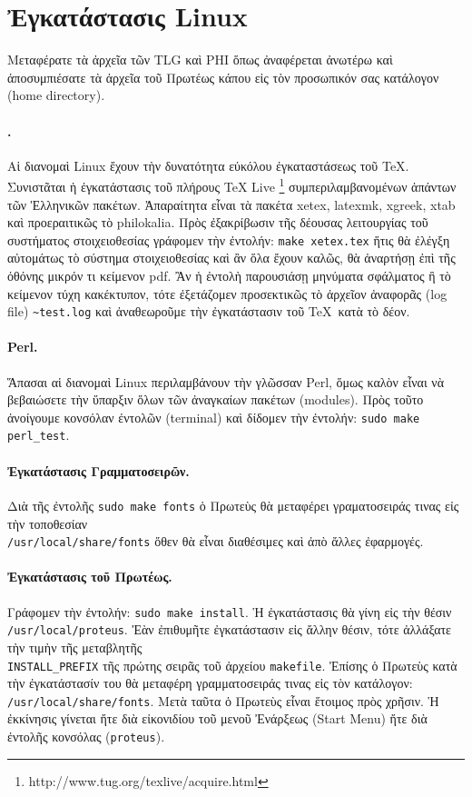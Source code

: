 \documentclass[12pt,a4paper]{article}
\begin{document}
\section{Ἐγκατάστασις Linux}
    Μεταφέρατε τὰ ἀρχεῖα τῶν TLG καὶ PHI ὅπως ἀναφέρεται ἀνωτέρω
    καὶ ἀποσυμπιέσατε τὰ ἀρχεῖα τοῦ Πρωτέως κάπου εἰς τὸν προσωπικόν σας
    κατάλογον (home directory).

    \paragraph{\XeTeX.}
      Αἱ διανομαὶ Linux ἔχουν τὴν δυνατότητα εὐκόλου ἐγκαταστάσεως τοῦ
      \TeX.  Συνιστᾶται  ἡ ἐγκατάστασις τοῦ πλήρους TeX Live
      \footnote{http://www.tug.org/texlive/acquire.html}
      συμπεριλαμβανομένων ἁπάντων τῶν Ἑλληνικῶν πακέτων.
      Ἀπαραίτητα εἶναι τὰ πακέτα xetex, latexmk, xgreek, xtab καὶ προεραιτικῶς τὸ philokalia.
      Πρὸς ἐξακρίβωσιν τῆς δέουσας λειτουργίας τοῦ συστήματος στοιχειοθεσίας
      γράφομεν τὴν ἐντολήν: {\tt make xetex.tex} ἥτις θὰ ἐλέγξη αὐτομάτως
      τὸ σύστημα στοιχειοθεσίας καὶ ἂν ὅλα ἔχουν καλῶς,
      θὰ ἀναρτήσῃ ἐπὶ τῆς ὀθόνης μικρόν τι κείμενον pdf.
      Ἂν ἡ ἐντολὴ παρουσιάσῃ μηνύματα σφάλματος ἢ τὸ κείμενον
      τύχη κακέκτυπον, τότε ἐξετάζομεν προσεκτικῶς τὸ ἀρχεῖον
      ἀναφορᾶς (log file) {\tt \~{}test.log} καὶ ἀναθεωροῦμε
      τὴν ἐγκατάστασιν τοῦ \TeX\ κατὰ τὸ δέον.
    \paragraph{Perl.}
      Ἅπασαι αἱ διανομαὶ Linux περιλαμβάνουν τὴν γλῶσσαν Perl,
      ὅμως καλὸν εἶναι νὰ βεβαιώσετε τὴν ὕπαρξιν ὅλων τῶν ἀναγκαίων
      πακέτων (modules). Πρὸς τοῦτο ἀνοίγουμε κονσόλαν ἐντολῶν (terminal)
      καὶ δίδομεν τὴν  ἐντολήν: {\tt sudo make perl\_test}.
      \paragraph{Ἐγκατάστασις Γραμματοσειρῶν.} Διὰ τῆς ἐντολῆς {\tt sudo
      make fonts} ὁ Πρωτεὺς θὰ μεταφέρει γραματοσειράς τινας εἰς τὴν
      τοποθεσίαν\\ {\tt /usr/local/share/fonts} ὅθεν θὰ εἶναι διαθέσιμες καὶ
      ἀπὸ ἄλλες ἐφαρμογές.
    \paragraph{Ἐγκατάστασις τοῦ Πρωτέως.}
      Γράφομεν τὴν ἐντολήν: {\tt sudo make install}.
      Ἡ ἐγκατάστασις θὰ γίνη εἰς τὴν θέσιν {\tt /usr/local/proteus}.
      Ἐὰν ἐπιθυμῆτε ἐγκατάστασιν εἰς ἄλλην θέσιν, τότε ἀλλάξατε τὴν τιμὴν
      τῆς μεταβλητῆς\\ {\tt INSTALL\_PREFIX} τῆς πρώτης σειρᾶς τοῦ ἀρχείου
    {\tt makefile}. Ἐπίσης ὁ Πρωτεὺς κατὰ τὴν ἐγκατάστασίν του θὰ μεταφέρη
      γραμματοσειράς τινας εἰς τὸν κατάλογον: {\tt /usr/local/share/fonts}.
      Μετὰ ταῦτα ὁ Πρωτεὺς εἶναι ἕτοιμος πρὸς χρῆσιν. Ἡ ἐκκίνησις γίνεται
      ἤτε διὰ εἰκονιδίου τοῦ μενοῦ Ἐνάρξεως (Start Menu) ἤτε διὰ ἐντολῆς
      κονσόλας ({\tt proteus}).
\end{document}
